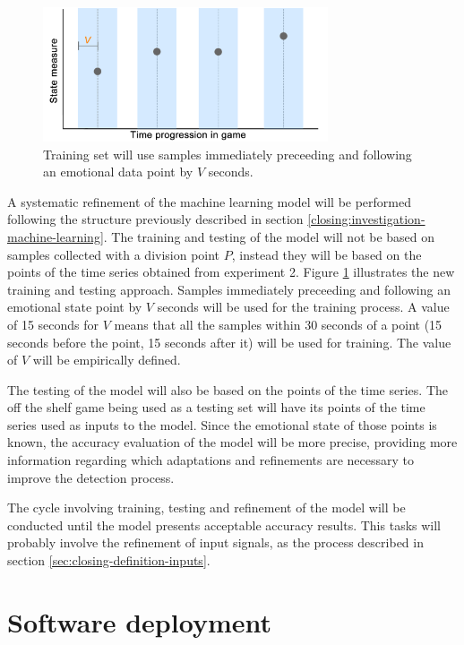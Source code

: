\begin{figure}[ht]
    \centering
    \includegraphics[width=0.75\textwidth]{figures/closing-around-time-series.png}
    \caption{Training set will use samples immediately preceeding and following an emotional data point by $V$ seconds.}
    \label{fig:closing-around-time-series}
\end{figure}

A systematic refinement of the machine learning model will be performed following the structure previously described in section \ref{closing:investigation-machine-learning}. The training and testing of the model will not be based on samples collected with a division point $P$, instead they will be based on the points of the time series obtained from experiment 2. Figure \ref{fig:closing-around-time-series} illustrates the new training and testing approach. Samples immediately preceeding and following an emotional state point by $V$ seconds will be used for the training process. A value of 15 seconds for $V$ means that all the samples within 30 seconds of a point (15 seconds before the point, 15 seconds after it) will be used for training. The value of $V$ will be empirically defined.

The testing of the model will also be based on the points of the time series. The off the shelf game being used as a testing set will have its points of the time series used as inputs to the model. Since the emotional state of those points is known, the accuracy evaluation of the model will be more precise, providing more information regarding which adaptations and refinements are necessary to improve the detection process.

The cycle involving training, testing and refinement of the model will be conducted until the model presents acceptable accuracy results. This tasks will probably involve the refinement of input signals, as the process described in section \ref{sec:closing-definition-inputs}.

\section{Software deployment}

